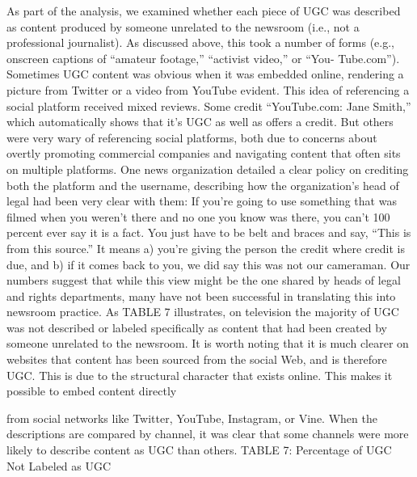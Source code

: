 \begin{enumerate}
As part of the analysis, we examined whether each piece of UGC was
described as content produced by someone unrelated to the newsroom (i.e.,
not a professional journalist). As discussed above, this took a number of
forms (e.g., onscreen captions of ``amateur footage,'' ``activist video,'' or ``You-
Tube.com''). Sometimes UGC content was obvious when it was embedded
online, rendering a picture from Twitter or a video from YouTube evident.
This idea of referencing a social platform received mixed reviews. Some
credit ``YouTube.com: Jane Smith,'' which automatically shows that it's UGC
as well as offers a credit. But others were very wary of referencing social
platforms, both due to concerns about overtly promoting commercial companies
and navigating content that often sits on multiple platforms.
One news organization detailed a clear policy on crediting both the platform
and the username, describing how the organization's head of legal had
been very clear with them:
If you're going to use something that was filmed when you weren't
there and no one you know was there, you can't 100 percent ever say
it is a fact. You just have to be belt and braces and say, ``This is from
this source.'' It means a) you're giving the person the credit where
credit is due, and b) if it comes back to you, we did say this was not
our cameraman.
Our numbers suggest that while this view might be the one shared by heads
of legal and rights departments, many have not been successful in translating
this into newsroom practice. As TABLE 7 illustrates, on television the
majority of UGC was not described or labeled specifically as content that
had been created by someone unrelated to the newsroom. It is worth noting
that it is much clearer on websites that content has been sourced from
the social Web, and is therefore UGC. This is due to the structural character
that exists online. This makes it possible to embed content directly

from social networks like Twitter, YouTube, Instagram, or Vine. When the
descriptions are compared by channel, it was clear that some channels were
more likely to describe content as UGC than others.
TABLE 7: Percentage of UGC Not Labeled as UGC


\end{enumerate}
